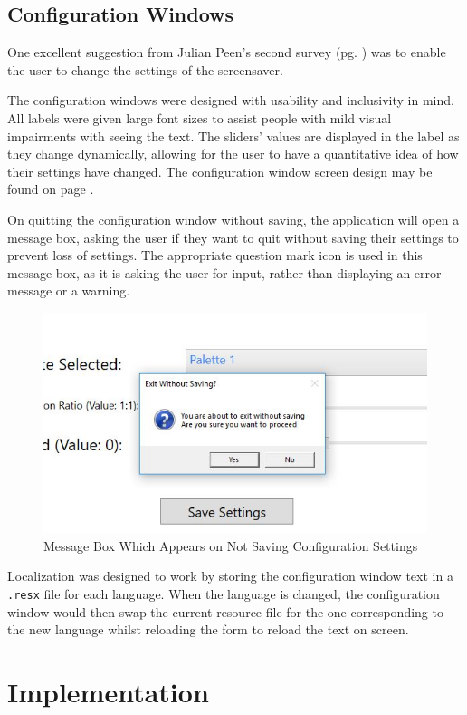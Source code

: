 \documentclass[10pt, openany]{book}
\begin{document}
\section{Configuration Windows}

One excellent suggestion from Julian Peen's second survey (pg. \pageref{app:survey-julian-2}) was to enable the user to change the settings of the screensaver.

The configuration windows were designed with usability and inclusivity in mind. All labels were given large font sizes to assist people with mild visual impairments with seeing the text. The sliders' values are displayed in the label as they change dynamically, allowing for the user to have a quantitative idea of how their settings have changed. The configuration window screen design may be found on page \pageref{app:config-screen}.

On quitting the configuration window without saving, the application will open a message box, asking the user if they want to quit without saving their settings to prevent loss of settings. The appropriate question mark icon is used in this message box, as it is asking the user for input, rather than displaying an error message or a warning.

\begin{figure}[H]
	\centering
	\includegraphics[width=.5\linewidth]{ExitWithoutSaving}
	\caption[Configuration Window Message Box]{Message Box Which Appears on Not Saving Configuration Settings}
\end{figure}	

Localization was designed to work by storing the configuration window text in a \texttt{.resx} file for each language. When the language is changed, the configuration window would then swap the current resource file for the one corresponding to the new language whilst reloading the form to reload the text on screen.

\chapter{Implementation}
\end{document}
